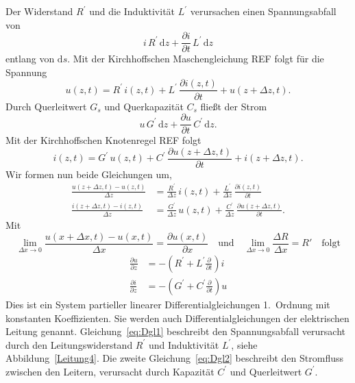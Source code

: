 \documentclass[paper=a4, parskip=half-, ngerman, fontsize=11pt]{scrreprt}
\begin{document}
Der Widerstand $R^{\prime}$ und die Induktivität $L^{\prime}$ verursachen einen Spannungsabfall von
\[
i \, R^{\prime} \, \mathrm{d}z + \frac{\partial i}{\partial t} \, L^{\prime} \, \mathrm{d} z
\]
entlang von $\mathrm{d}s$. Mit der Kirchhoffschen Maschengleichung {\color{red}REF} folgt für die Spannung
\begin{equation}
u(z, t) = R^{\prime} \, i(z, t) + L^{\prime} \, \frac{\partial i(z, t)}{\partial t} + u(z + \Delta z, t).
\end{equation}
Durch Querleitwert $G_{s}$ und Querkapazität $C_{s}$ fließt der Strom
\[
u \, G^{\prime} \, \mathrm{d}z + \frac{\partial u}{\partial t} \, C^{\prime} \, \mathrm{d} z.
\]
Mit der Kirchhoffschen Knotenregel {\color{red}REF} folgt
\begin{equation}
    i(z, t) = G^{\prime} \, u(z, t) + C^{\prime} \, \frac{\partial u(z + \Delta z, t)}{\partial t} + i(z + \Delta z, t).
\end{equation}
Wir formen nun beide Gleichungen um,
\begin{align}
\frac{u(z + \Delta z, t) - u(z, t)}{\Delta z} &= \frac{R^{\prime}}{\Delta z} \, i(z, t) + \frac{L^{\prime}}{\Delta z}
\,
\frac{\partial i(z, t)}{\partial t} \\
\frac{i(z + \Delta z, t) - i(z, t)}{\Delta z} &= \frac{G^{\prime}}{\Delta z} \, u(z, t) + \frac{C^{\prime}}{\Delta z}
\, \frac{\partial u(z + \Delta z, t)}{\partial t}.
\end{align}
Mit
\[
\lim_{\Delta x \to 0} \frac{u(x+\Delta x, t)-u(x, t)}{\Delta x} = \frac{\partial u(x, t)}{\partial x} \quad \text{und}
\quad \lim_{\Delta x \to 0} \frac{\Delta R}{\Delta x} = R' \quad \text{folgt}
\]
\begin{align}
    \frac{\partial u}{\partial z} &= -\left(R^{\prime} + L^{\prime}\frac{\partial}{\partial t}\right)i \label{eq:Dgl1}
    \\[1ex]
    \frac{\partial i}{\partial z} &= -\left(G^{\prime} + C^{\prime}\frac{\partial}{\partial t}\right)u \label{eq:Dgl2}
\end{align}
Dies ist ein System partieller linearer Differentialgleichungen 1.~Ordnung mit konstanten Koeffizienten. Sie werden
auch Differentialgleichungen der elektrischen Leitung genannt.
Gleichung~\eqref{eq:Dgl1} beschreibt den Spannungsabfall verursacht durch den Leitungswiderstand $R^{\prime}$ und
Induktivität $L^{\prime}$, siehe Abbildung~\ref{Leitung4}.
Die zweite Gleichung~\eqref{eq:Dgl2} beschreibt den Stromfluss zwischen den Leitern, verursacht durch Kapazität
$C^{\prime}$ und Querleitwert $G^{\prime}$.
\end{document}
